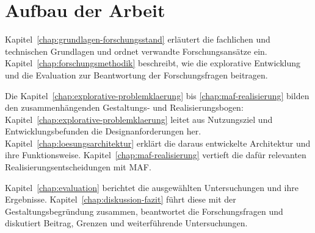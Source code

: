 \section{Aufbau der Arbeit}
\label{sec:einleitung-aufbau}

Kapitel~\ref{chap:grundlagen-forschungsstand} erläutert die fachlichen
und technischen Grundlagen und ordnet verwandte Forschungsansätze ein.
Kapitel~\ref{chap:forschungsmethodik} beschreibt, wie die explorative
Entwicklung und die Evaluation zur Beantwortung der Forschungsfragen
beitragen.

Die Kapitel~\ref{chap:explorative-problemklaerung} bis
\ref{chap:maf-realisierung} bilden den zusammenhängenden
Gestaltungs- und Realisierungsbogen:
Kapitel~\ref{chap:explorative-problemklaerung} leitet aus Nutzungsziel
und Entwicklungsbefunden die Designanforderungen her.
Kapitel~\ref{chap:loesungsarchitektur} erklärt die daraus entwickelte
Architektur und ihre Funktionsweise.
Kapitel~\ref{chap:maf-realisierung} vertieft die dafür relevanten
Realisierungsentscheidungen mit MAF.

Kapitel~\ref{chap:evaluation} berichtet die ausgewählten Untersuchungen
und ihre Ergebnisse. Kapitel~\ref{chap:diskussion-fazit} führt diese mit
der Gestaltungsbegründung zusammen, beantwortet die Forschungsfragen
und diskutiert Beitrag, Grenzen und weiterführende Untersuchungen.
